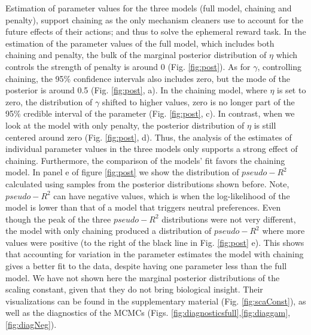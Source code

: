 \documentclass[
  12pt,
]{article}
\begin{document}
Estimation of parameter values for the three models (full model,
chaining and penalty), support chaining as the only mechanism cleaners
use to account for the future effects of their actions; and thus to
solve the ephemeral reward task. In the estimation of the parameter
values of the full model, which includes both chaining and penalty, the
bulk of the marginal posterior distribution of \(\eta\) which controls
the strength of penalty is around 0 (Fig. \ref{fig:post}). As for
\(\gamma\), controlling chaining, the 95\% confidence intervals also
includes zero, but the mode of the posterior is around 0.5 (Fig.
\ref{fig:post}, a). In the chaining model, where \(\eta\) is set to
zero, the distribution of \(\gamma\) shifted to higher values, zero is
no longer part of the 95\% credible interval of the parameter (Fig.
\ref{fig:post}, c). In contrast, when we look at the model with only
penalty, the posterior distribution of \(\eta\) is still centered around
zero (Fig. \ref{fig:post}, d). Thus, the analysis of the estimates of
individual parameter values in the three models only supports a strong
effect of chaining. Furthermore, the comparison of the models' fit
favors the chaining model. In panel e of figure \ref{fig:post} we show
the distribution of \(pseudo-R^2\) calculated using samples from the
posterior distributions shown before. Note, \(pseudo-R^2\) can have
negative values, which is when the log-likelihood of the model is lower
than that of a model that triggers neutral preferences. Even though the
peak of the three \(pseudo-R^2\) distributions were not very different,
the model with only chaining produced a distribution of \(pseudo-R^2\)
where more values were positive (to the right of the black line in Fig.
\ref{fig:post} e). This shows that accounting for variation in the
parameter estimates the model with chaining gives a better fit to the
data, despite having one parameter less than the full model. We have not
shown here the marginal posterior distributions of the scaling constant,
given that they do not bring biological insight. Their visualizations
can be found in the supplementary material (Fig. \ref{fig:scaConst}), as
well as the diagnostics of the MCMCs (Figs.
\ref{fig:diagnosticsfull},\ref{fig:diaggam},\ref{fig:diagNeg}).
\end{document}
